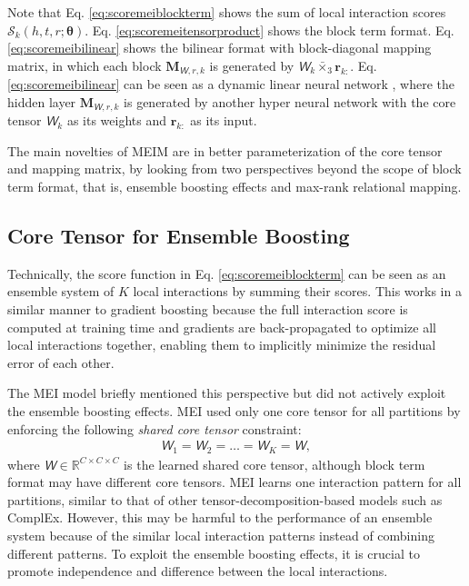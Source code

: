 \documentclass{article}
\def\vr{{\bm{r}}}
\def\mM{{\bm{M}}}
\newcommand{\tens}[1]{\bm{\mathsfit{#1}}}
\def\tW{{\tens{W}}}
\def\gS{{\mathcal{S}}}
\def\sR{{\mathbb{R}}}
\theoremstyle{plain}
\theoremstyle{remark}
\begin{document}
Note that Eq. \ref{eq:scoremeiblockterm} shows the sum of local interaction scores $ \gS_k (h,t,r;\bm{\theta}) $. Eq. \ref{eq:scoremeitensorproduct} shows the block term format. Eq. \ref{eq:scoremeibilinear} shows the bilinear format with block-diagonal mapping matrix, in which each block $ \mM_{\tW, r, k} $ is generated by $ \tW_k \bar{\times}_3 \vr_{k:} $. Eq. \ref{eq:scoremeibilinear} can be seen as a dynamic linear neural network \cite{tran_multipartitionembeddinginteraction_2020}, where the hidden layer $ \mM_{\tW, r, k} $ is generated by another hyper neural network \cite{ha_hypernetworks_2016} with the core tensor $ \tW_k $ as its weights and $ \vr_{k:} $ as its input.

The main novelties of MEIM are in better parameterization of the core tensor and mapping matrix, by looking from two perspectives beyond the scope of block term format, that is, ensemble boosting effects and max-rank relational mapping.

\subsection{Core Tensor for Ensemble Boosting} \label{sect:model_nonsharedcore} Technically, the score function in Eq. \ref{eq:scoremeiblockterm} can be seen as an ensemble system of $ K $ local interactions by summing their scores. This works in a similar manner to gradient boosting \cite{mason_boostingalgorithmsgradient_1999} because the full interaction score is computed at training time and gradients are back-propagated to optimize all local interactions together, enabling them to implicitly minimize the residual error of each other. 



The MEI model briefly mentioned this perspective but did not actively exploit the ensemble boosting effects. MEI used only one core tensor for all partitions by enforcing the following \textit{shared core tensor} constraint:
\begin{align}
\tW_{1} = \tW_{2} = \dots = \tW_{K} = \tW, \label{eq:constraintsharedcore}
\end{align}
where $ \tW \in \sR^{C \times C \times C} $ is the learned shared core tensor, although block term format may have different core tensors. MEI learns one interaction pattern for all partitions, similar to that of other tensor-decomposition-based models such as ComplEx. However, this may be harmful to the performance of an ensemble system because of the similar local interaction patterns instead of combining different patterns. To exploit the ensemble boosting effects, it is crucial to promote independence and difference between the local interactions. 
\end{document}
